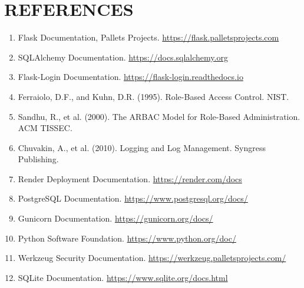 ﻿\documentclass[12pt]{article}
\def\normaltext{\fontsize{12pt}{18pt}\color{secondary}}
\begin{document}
\section*{{\color{primary}REFERENCES}}
\normaltext
\begin{enumerate}
\item Flask Documentation, Pallets Projects. \url{https://flask.palletsprojects.com}
\item SQLAlchemy Documentation. \url{https://docs.sqlalchemy.org}
\item Flask-Login Documentation. \url{https://flask-login.readthedocs.io}
\item Ferraiolo, D.F., and Kuhn, D.R. (1995). Role-Based Access Control. NIST.
\item Sandhu, R., et al. (2000). The ARBAC Model for Role-Based Administration. ACM TISSEC.
\item Chuvakin, A., et al. (2010). Logging and Log Management. Syngress Publishing.
\item Render Deployment Documentation. \url{https://render.com/docs}
\item PostgreSQL Documentation. \url{https://www.postgresql.org/docs/}
\item Gunicorn Documentation. \url{https://gunicorn.org/docs/}
\item Python Software Foundation. \url{https://www.python.org/doc/}
\item Werkzeug Security Documentation. \url{https://werkzeug.palletsprojects.com/}
\item SQLite Documentation. \url{https://www.sqlite.org/docs.html}
\end{enumerate}
\end{document}
